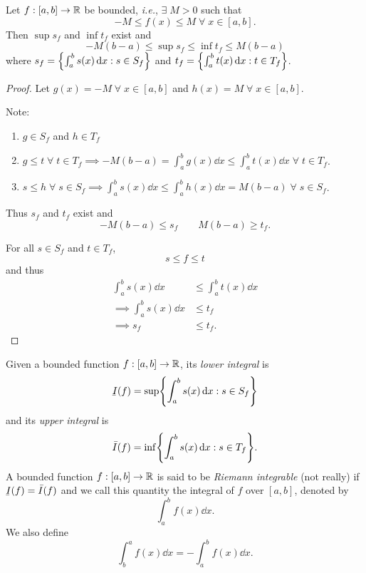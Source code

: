 \begin{lem}[] \label{lem:}
    Let $f : [a, b] \to \mathbb{R}$ be bounded, \textit{i.e.}, $\exists\; M > 0$ such that \[
        -M \leq f(x) \leq M \;\forall\; x \in [a, b].
    \] Then $\sup s_{f}$ and $\inf t_{f}$ exist and \[
        -M (b - a) \leq \sup s_{f} \leq \inf t_{f} \leq M (b - a)
    \] where $s_{f} = \set{\int_{a}^{b}s(x) \dd x : s \in S_{f}}$ and $t_{f} = \set{\int_{a}^{b} t(x) \dd x : t \in T_{f}}$.
\end{lem}
\begin{proof}
    Let $g(x) = -M \;\forall\; x \in [a, b]$ and $h(x) = M \;\forall\; x \in [a, b]$.

    Note:
    \begin{enumerate}[label=(\alph*)]
        \item $g \in S_{f}$ and $h \in T_{f}$
        \item $g \leq t \;\forall\; t \in T_{f} \implies -M (b - a) = \int_{a}^{b} g(x) \dd x \leq \int_{a}^{b} t(x) \dd x \;\forall\; t \in T_{f}$.
        \item $s \leq h \;\forall\; s \in S_{f} \implies \int_{a}^{b} s(x) \dd x \leq \int_{a}^{b} h(x) \dd x = M (b - a) \;\forall\; s \in S_{f}$.
    \end{enumerate}
    Thus $s_{f}$ and $t_{f}$ exist and \[
        -M(b - a) \leq s_{f} \qquad M(b - a) \geq t_{f}.
    \]

    For all $s \in S_{f}$ and $t \in T_{f}$, \[
        s \leq f \leq t
    \] and thus
    \begin{align*}
        \int_{a}^{b} s(x) \dd x &\leq \int_{a}^{b} t(x) \dd x \\
        \implies \int_{a}^{b} s(x) \dd x &\leq t_{f} \\
        \implies s_{f} &\leq t_{f}.
    \end{align*}
\end{proof}

\begin{defn}[] \label{defn:}
    Given a bounded function $f : [a, b] \to \mathbb{R}$, its \emph{lower integral} is \[
        \ubar{I}(f) = \sup \set{\int_{a}^{b} s(x) \dd x : s \in S_{f}}
    \] and its \emph{upper integral} is \[
        \bar{I}(f) = \inf \set{\int_{a}^{b} s(x) \dd x : s \in T_{f}}.
    \]
    A bounded function $f : [a, b] \to \mathbb{R}$ is said to be \emph{Riemann integrable} (not really) if $\ubar{I}(f) = \bar{I}(f)$ and we call this quantity the integral of $f$ over $[a, b]$, denoted by \[
        \int_{a}^{b} f(x) \dd x.
    \] We also define \[
        \int_{b}^{a} f(x) \dd x = -\int_{a}^{b} f(x) \dd x.
    \]
\end{defn}





